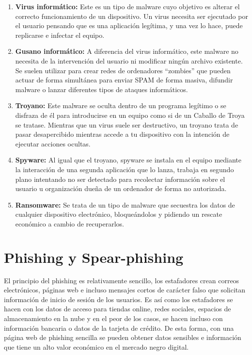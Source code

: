 \begin{enumerate}

\item {\bfseries Virus informático:}
Este es un tipo de malware cuyo objetivo es alterar el correcto funcionamiento de un dispositivo. Un virus necesita ser ejecutado por el usuario pensando que es una aplicación legítima, y una vez lo hace, puede replicarse e infectar el equipo.

\item {\bfseries Gusano informático:}
A diferencia del virus informático, este malware no necesita de la intervención del usuario ni modificar ningún archivo existente. Se suelen utilizar para crear redes de ordenadores “zombies” que pueden actuar de forma simultánea para enviar SPAM de forma masiva, difundir malware o lanzar diferentes tipos de ataques informáticos.

\item {\bfseries Troyano:}
Este malware se oculta dentro de un programa legítimo o se disfraza de él para introducirse en un equipo como si de un Caballo de Troya se tratase. Mientras que un virus suele ser destructivo, un troyano trata de pasar desapercibido mientras accede a tu dispositivo con la intención de ejecutar acciones ocultas.

\item {\bfseries Spyware:}
Al igual que el troyano, spyware se instala en el equipo mediante la interacción de una segunda aplicación que lo lanza, trabaja en segundo plano intentando no ser detectado para recolectar información sobre el usuario u organización dueña de un ordenador de forma no autorizada.

\item {\bfseries Ransomware:}
Se trata de un tipo de malware que secuestra los datos de cualquier dispositivo electrónico, bloqueándolos y pidiendo un rescate económico a cambio de recuperarlos.

\nocite{malware}

\end{enumerate}


\section{Phishing y Spear-phishing}
\label{sec:phishing-spear-phishing}

El principio del phishing es relativamente sencillo, los estafadores crean correos electrónicos, páginas web e incluso mensajes cortos de carácter falso 
que solicitan información de inicio de sesión de los usuarios. Es así como los estafadores se hacen con los datos de acceso para tiendas online, redes 
sociales, espacios de almacenamiento en la nube y en el peor de los casos, se hacen incluso con información bancaria o datos de la tarjeta de crédito. 
De esta forma, con una página web de phishing sencilla se pueden obtener datos sensibles e información que tiene un alto valor económico en el mercado 
negro digital.


